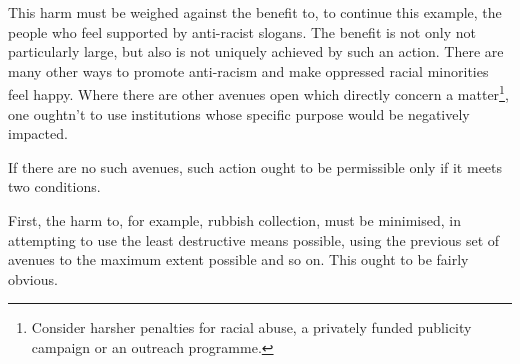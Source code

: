 \documentclass[12pt,a4paper]{report}
\begin{document}
\begin{multicols}{2}
\begin{multicols}{2}
This harm must be weighed against the benefit to, to continue this
example, the people who feel supported by anti-racist slogans. The
benefit is not only not particularly large, but also is not uniquely
achieved by such an action. There are many other ways to promote
anti-racism and make oppressed racial minorities feel happy. Where there
are other avenues open which directly concern a matter\footnote{Consider
	harsher penalties for racial abuse, a privately funded publicity
	campaign or an outreach programme.}, one oughtn't to use institutions
whose specific purpose would be negatively impacted.

If there are no such avenues, such action ought to be permissible only
if it meets two conditions.

First, the harm to, for example, rubbish collection, must be minimised,
in attempting to use the least destructive means possible, using the
previous set of avenues to the maximum extent possible and so on. This
ought to be fairly obvious.


\end{multicols}
\end{multicols}
\end{document}
